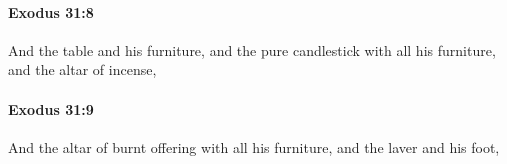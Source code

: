 		\paragraph{Exodus 31:8} %
			\label{EXODUS-31-8}

			And the table and his furniture, and the pure candlestick with all his furniture, and the altar of incense,


		\paragraph{Exodus 31:9} %
			\label{EXODUS-31-9}

			And the altar of burnt offering with all his furniture, and the laver and his foot,


